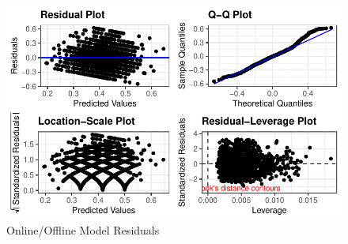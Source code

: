 \documentclass[]{interact}
\theoremstyle{plain}%
\theoremstyle{definition}
\theoremstyle{remark}
\begin{document}
\begin{figure}

{\centering \includegraphics{Social-Isolation-in-China-jg-revised_files/figure-pdf/fig-resids-online-offline-1.pdf}

}

\caption{\label{fig-resids-online-offline}Online/Offline Model
Residuals}

\end{figure}
\end{document}
